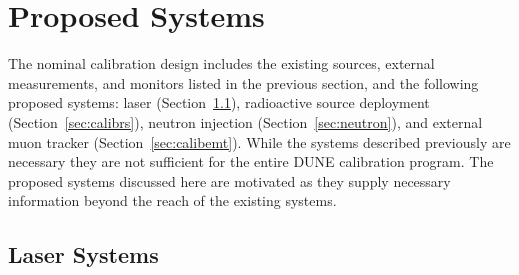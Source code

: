 

\section{Proposed Systems}
\label{sec:calibnew} 

The nominal calibration design includes the existing sources, external measurements, and monitors listed in the previous section, and the following proposed systems: laser (Section~\ref{sec:laser}), radioactive source deployment (Section~\ref{sec:calibrs}), neutron injection (Section~\ref{sec:neutron}), and external muon tracker (Section~\ref{sec:calibemt}). While the systems described previously are necessary they are not sufficient for the entire DUNE calibration program. The proposed systems discussed here are motivated as they supply necessary information beyond the reach of the existing systems. 

\subsection{Laser Systems}\label{sec:laser} %

